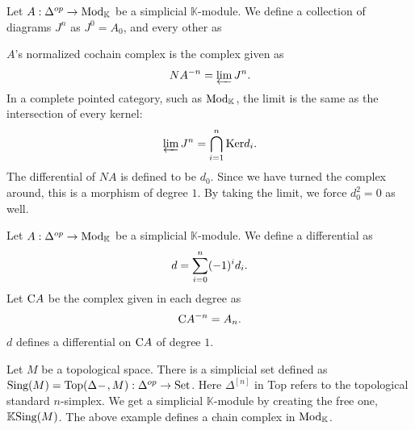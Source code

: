\documentclass[../thesis.tex]{subfiles}
\begin{document}
            \begin{example}
                Let $A : \Delta^{op} \rightarrow \tt{Mod}_\mathbb{K}$ be a simplicial $\mathbb{K}$-module.  We define a collection of diagrams $J^n$ as $J^0 = A_0$, and every other as
                \begin{center}
                \end{center}
                $A$'s normalized cochain complex is the complex given as
                \begin{align*}
                    NA^{-n} = \varprojlim J^n\tt{.}
                \end{align*}
                In a complete pointed category, such as $\tt{Mod}_\mathbb{K}$, the limit is the same as the intersection of every kernel:
                \begin{align*}
                    \varprojlim J^n = \bigcap_{i=1}^n\tt{Ker}d_i\tt{.}
                \end{align*}
                The differential of $NA$ is defined to be $d_0$. Since we have turned the complex around, this is a morphism of degree $1$. By taking the limit, we force $d_0^2 = 0$ as well.
            \end{example}
            \begin{example}\label{ex: ass-complex}
                Let $A : \Delta^{op} \rightarrow \tt{Mod}_\mathbb{K}$ be a simplicial $\mathbb{K}$-module. We define a differential as
                \begin{align*}
                    d = \sum_{i=0}^n(-1)^id_i\tt{.}
                \end{align*}
                Let $\tt{C}A$ be the complex given in each degree as
                \begin{align*}
                    \tt{C}A^{-n} = A_n\tt{.}
                \end{align*}
                $d$ defines a differential on $\tt{C}A$ of degree $1$.
            \end{example}
            \begin{example}
                Let $M$ be a topological space. There is a simplicial set defined as $\tt{Sing}(M) = \tt{Top}(\Delta^{\argument},M) : \Delta^{op} \rightarrow \tt{Set}$. Here $\Delta^{[n]}$ in Top refers to the topological standard $n$-simplex. We get a simplicial $\mathbb{K}$-module by creating the free one, $\mathbb{K}\tt{Sing}(M)$. The above example defines a chain complex in $\tt{Mod}_\mathbb{K}$.
            \end{example}
\end{document}
